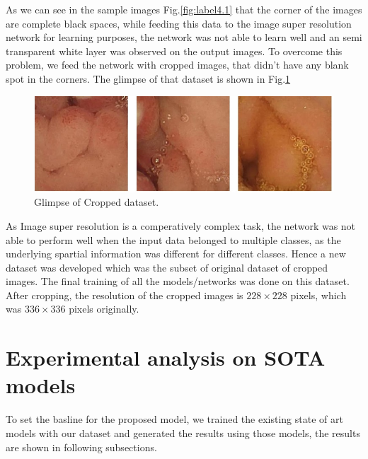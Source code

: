 \newpage
As we can see in the sample images Fig.\ref{fig:label4.1} that the corner of the images are complete black spaces, while feeding this data to the image super resolution network for learning purposes, the network was not able to learn well and an semi transparent white layer was observed on the output images. To overcome this problem, we feed the network with cropped images, that didn't have any blank spot in the corners.
The glimpse of that dataset is shown in Fig.\ref{fig:label4.2}
\begin{figure}[h]
    \centering
    \includegraphics[totalheight=1.5in]{Chapter4/Fig4.2.jpg}
    \caption[Glimpse of Cropped dataset]{Glimpse of Cropped dataset.\cite{data}}
    \label{fig:label4.2}
\end{figure}
\newline
As Image super resolution is a comperatively complex task, the network was not able to perform well when the input data belonged to multiple classes, as the underlying spartial information was different for different classes. Hence a new dataset was developed which was the subset of original dataset of cropped images.
The final training of all the models/networks was done on this dataset. After cropping, the resolution of the cropped images is $228 \times 228$ pixels, which was $336 \times 336$ pixels originally.
\section{Experimental analysis on SOTA models}
To set the basline for the proposed model, we trained the existing state of art models with our dataset and generated the results using those models, the results are shown in following subsections.
